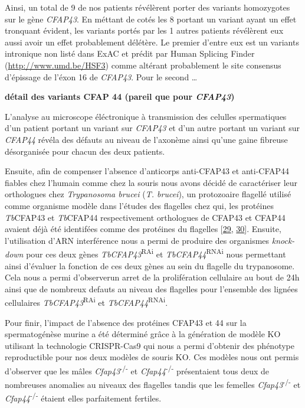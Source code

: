 \documentclass[12pt,twoside]{ugathesis}
\begin{document}
Ainsi, un total de 9 de nos patients révélèrent porter des variants
homozygotes sur le gène \emph{CFAP43}. En méttant de cotés les 8 portant
un variant ayant un effet tronquant évident, les variants portés par les
1 autres patients révélèrent eux aussi avoir un effet probablement
délétère. Le premier d'entre eux est un variants intronique non listé
dans ExAC et prédit par Human Splicing Finder
(\url{http://www.umd.be/HSF3}) comme altérant probablement le site
consensus d'épissage de l'éxon 16 de \emph{CFAP43}. Pour le second
\ldots{}

\textbf{détail des variants CFAP 44 (pareil que pour \emph{CFAP43})}

L'analyse au microscope éléctronique à transmission des celulles
spermatiques d'un patient portant un variant sur \emph{CFAP43} et d'un
autre portant un variant sur \emph{CFAP44} révéla des défauts au niveau
de l'axonème ainsi qu'une gaine fibreuse désorganisée pour chacun des
deux patients.

Ensuite, afin de compenser l'absence d'anticorps anti-CFAP43 et
anti-CFAP44 fiables chez l'humain comme chez la souris nous avons décidé
de caractériser leur orthologues chez \emph{Trypanosoma brucei}
(\emph{T. brucei}), un protozoaire flagellé utilisé comme organisme
modèle dans l'études des flagelles chez qui, les protéines
\emph{Tb}CFAP43 et \emph{Tb}CFAP44 respectivement orthologues de CFAP43
et CFAP44 avaient déjà été identifées comme des protéines du flagelles
{[}\protect\hyperlink{ref-Broadhead2006}{29},
\protect\hyperlink{ref-Subota2014}{30}{]}. Ensuite, l'utilisation d'ARN
interférence nous a permi de produire des organismes \emph{knock-down}
pour ces deux gènes \emph{TbCFAP43}\textsuperscript{RAi} et
\emph{TbCFAP44}\textsuperscript{RNAi} nous permettant ainsi d'évaluer la
fonction de ces deux gènes au sein du flagelle du trypanosome. Cela nous
a permi d'observerun arret de la prolifération cellulaire au bout de 24h
ainsi que de nombreux defauts au niveau des flagelles pour l'ensemble
des lignées cellulaires \emph{TbCFAP43}\textsuperscript{RAi} et
\emph{TbCFAP44}\textsuperscript{RNAi}.

Pour finir, l'impact de l'absence des protéines CFAP43 et 44 sur la
spermatogénèse murine a été déterminé grâce à la génération de modèle KO
utilisant la technologie CRISPR-Cas9 qui nous a permi d'obtenir des
phénotype reproductible pour nos deux modèles de souris KO. Ces modèles
nous ont permis d'observer que les mâles
\emph{Cfap43}\textsuperscript{-/-} et \emph{Cfap44}\textsuperscript{-/-}
présentaient tous deux de nombreuses anomalies au niveaux des flagelles
tandis que les femelles \emph{Cfap43}\textsuperscript{-/-} et
\emph{Cfap44}\textsuperscript{-/-} étaient elles parfaitement fertiles.
\end{document}
